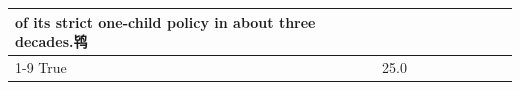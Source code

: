\begin{table}[H]
\begin{tabular}{lllrlllll}
of its strict one-child policy in about three decades.鸨 \\
\cline{1-9}
True & 25.0%
\end{tabular}
\end{table}
